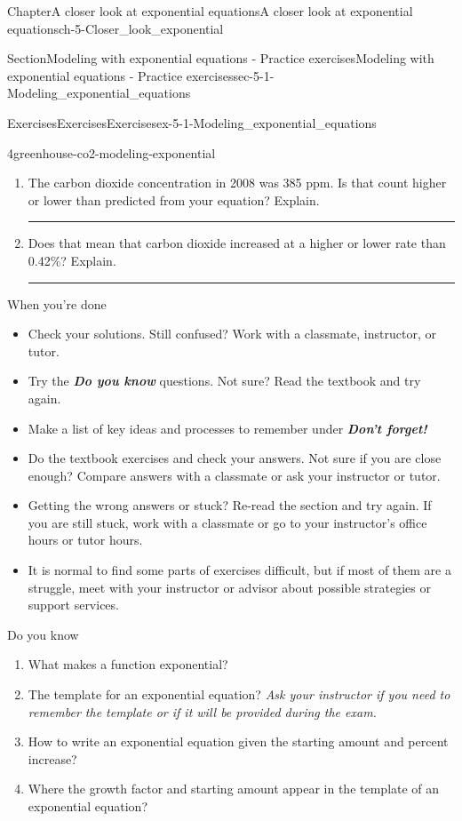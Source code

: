 \documentclass[twoside,11pt,]{book}
\newcommand{\alert}[1]{\textbf{\textit{#1}}}
\newlength{\workspacestrutwidth}
\numberwithin{equation}{section}
\begin{document}
\begin{chapterptx}{Chapter}{A closer look at exponential equations}{}{A closer look at exponential equations}{}{}{ch-5-Closer_look_exponential}
\begin{sectionptx}{Section}{Modeling with exponential equations - Practice exercises}{}{Modeling with exponential equations - Practice exercises}{}{}{sec-5-1-Modeling_exponential_equations}
\begin{exercises-subsection-numberless}{Exercises}{Exercises}{}{Exercises}{}{}{ex-5-1-Modeling_exponential_equations}
\begin{divisionexercise}{4}{}{}{greenhouse-co2-modeling-exponential}
\begin{enumerate}[label=(\alph*),ref=\alph*]
\item{}The carbon dioxide concentration in 2008 was 385 ppm. Is that count higher or lower than predicted from your equation? Explain.%
\par\rule{\workspacestrutwidth}{1.4in}%
\item{}Does that mean that carbon dioxide increased at a higher or lower rate than 0.42\%? Explain.%
\par\rule{\workspacestrutwidth}{1.4in}%
\end{enumerate}%
\end{divisionexercise}%
\end{exercises-subsection-numberless}
\begin{conclusion}{When you're done \textellipsis{}}%
%
\begin{itemize}[label=\textbullet]
\item{}Check your solutions. Still confused? Work with a classmate, instructor, or tutor.%
\item{}Try the \alert{Do you know} questions. Not sure? Read the textbook and try again.%
\item{}Make a list of key ideas and processes to remember under \alert{Don't forget!}%
\item{}Do the textbook exercises and check your answers. Not sure if you are close enough? Compare answers with a classmate or ask your instructor or tutor.%
\item{}Getting the wrong answers or stuck? Re-read the section and try again. If you are still stuck, work with a classmate or go to your instructor's office hours or tutor hours.%
\item{}It is normal to find some parts of exercises difficult, but if most of them are a struggle, meet with your instructor or advisor about possible strategies or support services.%
\end{itemize}
%
\end{conclusion}%
\begin{conclusion}{Do you know \textellipsis{}}%
%
\begin{enumerate}[label={\Alph*.}]
\item{}What makes a function exponential?%
\item{}The template for an exponential equation? \emph{Ask your instructor if you need to remember the template or if it will be provided during the exam.}%
\item{}How to write an exponential equation given the starting amount and percent increase?%
\item{}Where the growth factor and starting amount appear in the template of an exponential equation?%

\end{enumerate}
\end{conclusion}
\end{sectionptx}
\end{chapterptx}
\end{document}
